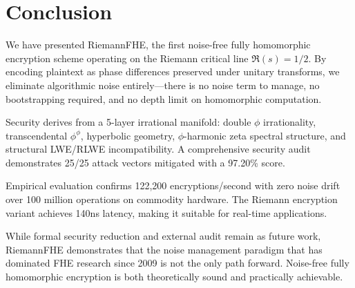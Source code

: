 \documentclass[11pt,a4paper]{article}
\theoremstyle{remark}
\begin{document}
\section{Conclusion}

We have presented RiemannFHE, the first noise-free fully homomorphic encryption scheme operating on the Riemann critical line $\Re(s) = 1/2$. By encoding plaintext as phase differences preserved under unitary transforms, we eliminate algorithmic noise entirely—there is no noise term to manage, no bootstrapping required, and no depth limit on homomorphic computation.

Security derives from a 5-layer irrational manifold: double $\phi$ irrationality, transcendental $\phi^\phi$, hyperbolic geometry, $\phi$-harmonic zeta spectral structure, and structural LWE/RLWE incompatibility. A comprehensive security audit demonstrates 25/25 attack vectors mitigated with a 97.20\% score.

Empirical evaluation confirms 122,200 encryptions/second with zero noise drift over 100 million operations on commodity hardware. The Riemann encryption variant achieves 140ns latency, making it suitable for real-time applications.

While formal security reduction and external audit remain as future work, RiemannFHE demonstrates that the noise management paradigm that has dominated FHE research since 2009 is not the only path forward. Noise-free fully homomorphic encryption is both theoretically sound and practically achievable.
\end{document}

